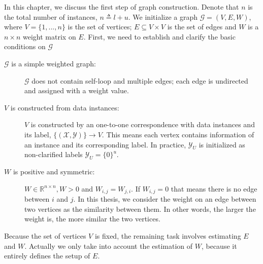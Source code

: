In this chapter, we discuss the first step of graph construction. Denote that $n$ is the total number of instances, $n \triangleq l + u$. We initialize a graph $\mathcal{G} = (V, E, W)$, where $V=\{1,  ..., n\}$ is the set of vertices; $E \subseteq V \times V$ is the set of edges and $W$ is a $n \times n$ weight matrix on $E$. First, we need to establish and clarify the basic conditions on $\mathcal{G}$
\begin{description}
	\item[$\mathcal{G}$ is a simple weighted graph:] $\mathcal{G}$ does not contain self-loop and multiple edges; each edge is undirected and assigned with a weight value.
	
	\item[$V$ is constructed from data instances: ] $V$ is constructed by an one-to-one correspondence with data instances and its label, $\{ (\mathcal{X}, \mathcal{Y}) \} \rightarrow V$. This means each vertex contains information of an instance and its corresponding label. In practice, $\mathcal{Y}_U$ is initialized as non-clarified labels $\mathcal{Y}_U = \{ 0 \}^u$.
	
	\item[$W$ is positive and symmetric: ] $W \in \mathbb{R}^{n\times n}, W > 0$ and $W_{i,j} = W_{j,i}$. If $W_{i,j} = 0$ that means there is no edge between $i$ and $j$. In this thesis, we consider the weight on an edge between two vertices as the similarity between them. In other words, the larger the weight is, the more similar the two vertices.
\end{description}

Because the set of vertices $V$ is fixed, the remaining task involves estimating $E$ and $W$. Actually we only take into account the estimation of $W$, because it entirely defines the setup of $E$.

